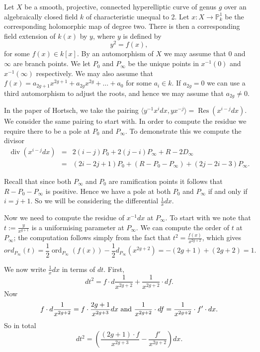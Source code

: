 \documentclass[draft, 11pt]{article} %
\title{}
\author{}
\theoremstyle{plain}
\theoremstyle{remark}
\DeclareMathOperator{\res}{Res}
\DeclareMathOperator{\ord}{ord}
\DeclareMathOperator{\di}{div}
\begin{document}
\maketitle


Let $X$ be a smooth, projective, connected hyperelliptic curve of genus $g$ over an algebraically closed field $k$ of characteristic unequal to 2.
Let $x:X\rightarrow \mathbb P_k^1$ be the corresponding holomorphic map of degree two.
There is then a corresponding field extension of $k(x)$ by $y$, where $y$ is defined by
\[
y^2 = f(x),
\]
for some $f(x)\in k[x]$.
By an automorphism of $X$ we may assume that $0$ and $\infty$ are branch points.
We let $P_0$ and $P_\infty$ be the unique points in $x^{-1}(0)$ and $x^{-1}(\infty)$ respectively.
We may also assume that $f(x) = a_{2g+1}x^{2g+1} + a_{2g}x^{2g} + \ldots + a_0$ for some $a_i \in k$.
If $a_{2g}=0$ we can use a third automorphism to adjust the roots, and hence we may assume that $a_{2g} \neq 0$.


In the paper of Hortsch, we take the pairing $\langle y^{-1}x^idx, yx^{-j} \rangle = \res(x^{i-j}dx)$.
We consider the same pairing to start with.
In order to compute the residue we require there to be a pole at $P_0$ and $P_\infty$. 
To demonstrate this we compute the divisor
\begin{eqnarray}
	\di(x^{i-j}dx) & = &  2(i-j)P_0 +  2(j-i)P_\infty + R - 2D_\infty \\
	& = & (2i-2j+1)P_0 +(R-P_0-P_\infty) +(2j-2i-3)P_\infty.
\end{eqnarray}

Recall that since both $P_\infty$ and $P_0$ are ramification points it follows that $R-P_0-P_\infty$ is positive.
Hence we have a pole at both $P_0$ and $P_\infty$ if and only if $i=j+1$.
So we will be considering the differential $\frac{1}{x}dx$.


Now we need to compute the residue of $x^{-1}dx$ at $P_\infty$.
To start with we note that $t:= \frac{y}{x^{g+1}}$ is a uniformising parameter at $P_\infty$.
We can compute the order of $t$ at $P_\infty$; the computation follows simply from the fact that $t^2 = \frac{f(x)}{x^{2g+2}}$, which gives
\[
ord_{P_\infty}(t) = \frac{1}{2}\ord_{P_\infty}(f(x)) - \frac{1}{2}d_{P_\infty}(x^{2g+2}) = -(2g+1) + (2g+2) = 1.
\]

We now write $\frac{1}{x}dx$ in terms of $dt$.
First, 
\[
dt^2 = f\cdot d\frac{1}{x^{2g+2}} + \frac{1}{x^{2g+2}} \cdot df.
\]
Now 
\[
f\cdot d\frac{1}{x^{2g+2}} = f\cdot \frac{2g+1}{x^{2g+3}} dx \ {\rm and}\ \frac{1}{x^{2g+2}} \cdot df = \frac{1}{x^{2g+2}}\cdot f' \cdot dx.
\]
So in total 
\[
dt^2 = \left (\frac{(2g+1)\cdot f}{x^{2g+3}} - \frac{f'}{x^{2g+2}} \right ) dx.
\]
\end{document}
